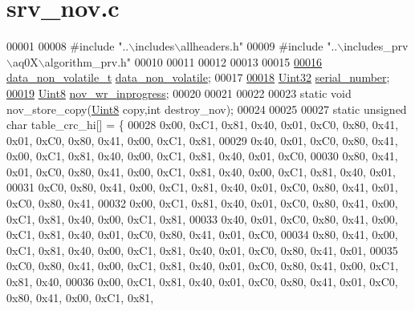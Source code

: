 \hypertarget{a00060_source}{\section{srv\+\_\+nov.\+c}
\label{a00060_source}
}

\begin{DoxyCode}
00001 
00008 \textcolor{preprocessor}{#include "..\(\backslash\)includes\(\backslash\)allheaders.h"}
00009 \textcolor{preprocessor}{#include "..\(\backslash\)includes\_prv\(\backslash\)aq0X\(\backslash\)algorithm\_prv.h"}
00010 
00011 
00012 
00013 
00015 
\hypertarget{a00060_source_l00016}{}\hyperlink{a00060_a76ac5f917f5308dcd83de0d7c94559fb}{00016} \hyperlink{a00022_a8e66478e65e03ebc9434466e51c0ad0b}{data\_non\_volatile\_t}         \hyperlink{a00060_a76ac5f917f5308dcd83de0d7c94559fb}{data\_non\_volatile};
00017 
\hypertarget{a00060_source_l00018}{}\hyperlink{a00060_a728c5fe7bc16e168a8f93fba18ee5561}{00018} \hyperlink{a00072_aba99025e657f892beb7ff31cecf64653}{Uint32}                    \hyperlink{a00060_a728c5fe7bc16e168a8f93fba18ee5561}{serial\_number};
\hypertarget{a00060_source_l00019}{}\hyperlink{a00060_a56fe014653ebdce270aeac664bf86e65}{00019} \hyperlink{a00072_af84840501dec18061d18a68c162a8fa2}{Uint8}                  \hyperlink{a00060_a56fe014653ebdce270aeac664bf86e65}{nov\_wr\_inprogress};
00020 
00021 
00022 
00023 \textcolor{keyword}{static} \textcolor{keywordtype}{void} nov\_store\_copy(\hyperlink{a00072_af84840501dec18061d18a68c162a8fa2}{Uint8} copy,\textcolor{keywordtype}{int} destroy\_nov);
00024 
00025 
00027 \textcolor{keyword}{static} \textcolor{keywordtype}{unsigned} \textcolor{keywordtype}{char} table\_crc\_hi[] = \{
00028 0x00, 0xC1, 0x81, 0x40, 0x01, 0xC0, 0x80, 0x41, 0x01, 0xC0, 0x80, 0x41, 0x00, 0xC1, 0x81,
00029 0x40, 0x01, 0xC0, 0x80, 0x41, 0x00, 0xC1, 0x81, 0x40, 0x00, 0xC1, 0x81, 0x40, 0x01, 0xC0,
00030 0x80, 0x41, 0x01, 0xC0, 0x80, 0x41, 0x00, 0xC1, 0x81, 0x40, 0x00, 0xC1, 0x81, 0x40, 0x01,
00031 0xC0, 0x80, 0x41, 0x00, 0xC1, 0x81, 0x40, 0x01, 0xC0, 0x80, 0x41, 0x01, 0xC0, 0x80, 0x41,
00032 0x00, 0xC1, 0x81, 0x40, 0x01, 0xC0, 0x80, 0x41, 0x00, 0xC1, 0x81, 0x40, 0x00, 0xC1, 0x81,
00033 0x40, 0x01, 0xC0, 0x80, 0x41, 0x00, 0xC1, 0x81, 0x40, 0x01, 0xC0, 0x80, 0x41, 0x01, 0xC0,
00034 0x80, 0x41, 0x00, 0xC1, 0x81, 0x40, 0x00, 0xC1, 0x81, 0x40, 0x01, 0xC0, 0x80, 0x41, 0x01,
00035 0xC0, 0x80, 0x41, 0x00, 0xC1, 0x81, 0x40, 0x01, 0xC0, 0x80, 0x41, 0x00, 0xC1, 0x81, 0x40,
00036 0x00, 0xC1, 0x81, 0x40, 0x01, 0xC0, 0x80, 0x41, 0x01, 0xC0, 0x80, 0x41, 0x00, 0xC1, 0x81,

\end{DoxyCode}
